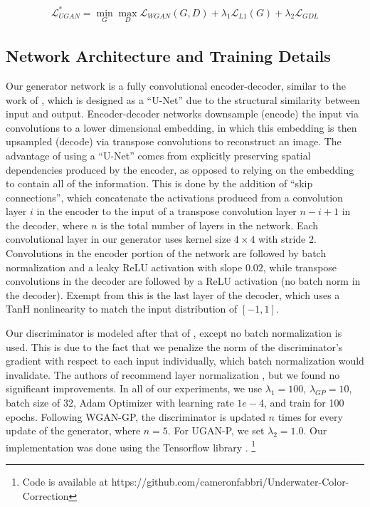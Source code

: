 \documentclass[conference,reqno]{IEEEtran}
\begin{document}
\begin{equation}
   \begin{aligned}
      \mathcal{L}_{UGAN}^* = \min\limits_{G}\max\limits_{D} \mathcal{L}_{WGAN}(G,D) + \lambda_{1} \mathcal{L}_{L1}(G) +  \lambda_{2} \mathcal{L}_{GDL}
   \end{aligned}
\end{equation}


\subsection{Network Architecture and Training Details}
Our generator network is a fully convolutional encoder-decoder, similar to the work of \cite{isola2016image}, which is
designed as a ``U-Net'' \cite{ronneberger2015u} due to the structural similarity between input and output.
Encoder-decoder networks downsample (encode) the input via convolutions to a lower dimensional embedding, in which
this embedding is then upsampled (decode) via transpose convolutions to reconstruct an image. The advantage of using
a ``U-Net'' comes from explicitly preserving spatial dependencies produced by the encoder, as opposed to relying on the
embedding to contain all of the information. This is done by the addition of ``skip connections'', which concatenate
the activations produced from a convolution layer $i$ in the encoder to the input of a transpose convolution layer
$n-i+1$ in the decoder, where $n$ is the total number of layers in the network. Each convolutional layer in our
generator uses kernel size $4 \times 4$ with stride 2. Convolutions in the encoder portion of the network are followed
by batch normalization \cite{pmlr-v37-ioffe15} and a leaky ReLU activation with slope $0.02$, while transpose
convolutions in the decoder are followed by a ReLU activation \cite{nair2010rectified} (no batch norm in the decoder).
Exempt from this is the last
layer of the decoder, which uses a TanH nonlinearity to match the input distribution of $[-1, 1]$. 

Our discriminator is modeled after that of \cite{radford2015unsupervised}, except no batch normalization is used. This
is due to the fact that we penalize the norm of the discriminator's gradient with respect to each input individually,
which batch normalization would invalidate. The authors of \cite{gulrajani2017improved} recommend layer normalization
\cite{ba2016layer}, but we found no significant improvements. In all of our experiments, we use $\lambda_{1} = 100$,
$\lambda_{GP} = 10$, batch size of 32, Adam Optimizer \cite{kingma2014adam} with learning rate $1e-4$, and train for 100 epochs.
Following WGAN-GP, the discriminator is updated $n$ times for every update of the generator, where $n = 5$.
For UGAN-P, we set $\lambda_{2} = 1.0$.
Our implementation was done using the Tensorflow library \cite{abadi2016tensorflow}.
\footnote{Code is available at https://github.com/cameronfabbri/Underwater-Color-Correction}
\end{document}
